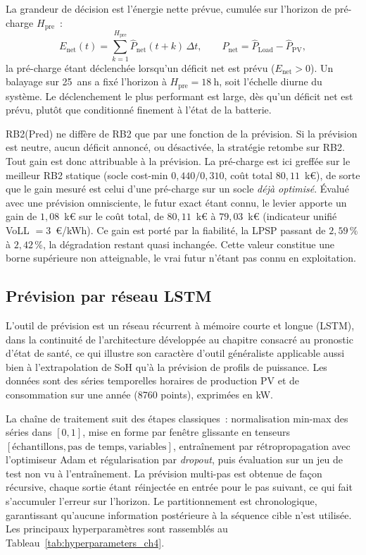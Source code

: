 La grandeur de décision est l'énergie nette prévue, cumulée sur l'horizon de pré-charge $H_{\text{pre}}$~:
\begin{equation}
\label{eq:net_energy}
E_{\text{net}}(t) = \sum_{k=1}^{H_{\text{pre}}} \hat{P}_{\text{net}}(t+k)\,\Delta t,
\qquad
\hat{P}_{\text{net}} = \hat{P}_{\text{Load}} - \hat{P}_{\text{PV}},
\end{equation}
la pré-charge étant déclenchée lorsqu'un déficit net est prévu ($E_{\text{net}}>0$). Un balayage sur 25~ans a fixé l'horizon à $H_{\text{pre}}=\SI{18}{\hour}$, soit l'échelle diurne du système. Le déclenchement le plus performant est large, dès qu'un déficit net est prévu, plutôt que conditionné finement à l'état de la batterie.

RB2(Pred) ne diffère de RB2 que par une fonction de la prévision. Si la prévision est neutre, aucun déficit annoncé, ou désactivée, la stratégie retombe sur RB2. Tout gain est donc attribuable à la prévision. La pré-charge est ici greffée sur le meilleur RB2 statique (socle cost-min $0{,}440/0{,}310$, coût total $80{,}11$~k€), de sorte que le gain mesuré est celui d'une pré-charge sur un socle \emph{déjà optimisé}. Évalué avec une prévision omnisciente, le futur exact étant connu, le levier apporte un gain de $1{,}08$~k€ sur le coût total, de $80{,}11$~k€ à $79{,}03$~k€ (indicateur unifié VoLL $=3$~€/kWh). Ce gain est porté par la fiabilité, la LPSP passant de $2{,}59\,\%$ à $2{,}42\,\%$, la dégradation restant quasi inchangée. Cette valeur constitue une borne supérieure non atteignable, le vrai futur n'étant pas connu en exploitation.

\subsection{Prévision par réseau LSTM}
\label{subsec:lstm}

L'outil de prévision est un réseau récurrent à mémoire courte et longue (LSTM), dans la continuité de l'architecture développée au chapitre consacré au pronostic d'état de santé, ce qui illustre son caractère d'outil généraliste applicable aussi bien à l'extrapolation de SoH qu'à la prévision de profils de puissance. Les données sont des séries temporelles horaires de production PV et de consommation sur une année (\num{8760} points), exprimées en kW.

La chaîne de traitement suit des étapes classiques~: normalisation min-max des séries dans $[0,1]$, mise en forme par fenêtre glissante en tenseurs $[\text{échantillons}, \text{pas de temps}, \text{variables}]$, entraînement par rétropropagation avec l'optimiseur Adam et régularisation par \textit{dropout}, puis évaluation sur un jeu de test non vu à l'entraînement. La prévision multi-pas est obtenue de façon récursive, chaque sortie étant réinjectée en entrée pour le pas suivant, ce qui fait s'accumuler l'erreur sur l'horizon. Le partitionnement est chronologique, garantissant qu'aucune information postérieure à la séquence cible n'est utilisée. Les principaux hyperparamètres sont rassemblés au Tableau~\ref{tab:hyperparameters_ch4}.

